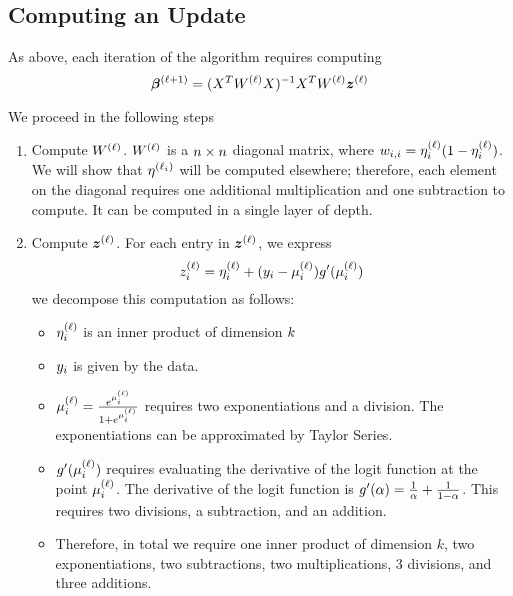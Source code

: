 \subsection{Computing an Update}
As above, each iteration of the algorithm requires computing
\begin{equation}
	\coefficients{\step+1} = \inversemat{(\transpose{\xdata}\wmatrix{\step}\xdata)}\transpose{\xdata} \wmatrix{\step}\updatevector{\step}
\end{equation}


We proceed in the following steps
\begin{enumerate}

	\item Compute $W^{(\ell)}$. 
	 $W^{(\ell)}$ is a $n \times n$ diagonal matrix, where
	  $w_{i,i} = \eta^{(\ell)}_{i}(1-\eta^{(\ell)}_{i}) $. 
	 We will show that $\eta^{(\ell_{i})}$ will be computed elsewhere; therefore, each element on the diagonal requires one additional multiplication and one subtraction to compute. It can be computed in a single layer of depth.
	
	\item Compute $\updatevector{\step}$.
	For each entry in $\updatevector{\step}$, we express
	\[
		z^{(\ell)}_{i} = \eta^{(\ell)}_{i} +
		 (y_{i} - \mu^{(\ell)}_{i})
		 g'(\mu^{(\ell)}_{i})
	\]
	we decompose this computation as follows:
	\begin{itemize}
		\item $\eta^{(\ell)}_{i}$ is an inner product of dimension $k$
		\item $y_{i}$ is given by the data. 
		\item $\mu^{(\ell)}_{i} = \frac{e^{\mu^{(\ell)}_{i}}}{1+e^{\mu^{(\ell)}_{i}}}$ requires two exponentiations and a division. The exponentiations can be approximated by Taylor Series. %
		\item $ g'(\mu^{(\ell)}_{i})$ requires evaluating the derivative of the logit function at the point $\mu^{(\ell)}_{i}$. The derivative of the logit function is $g'(\alpha) = \frac{1}{\alpha}+\frac{1}{1-\alpha}$. This requires two divisions, a subtraction, and an addition. 
		\item Therefore, in total we require one inner product of dimension $k$, two exponentiations, two subtractions, two multiplications, 3 divisions, and three additions.
	\end{itemize}
	

\end{enumerate}

